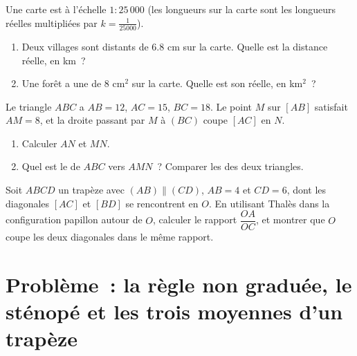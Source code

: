 \begin{exercise}[$\star\star$]\label{exo:g9:thales:7}
Une carte est à l'échelle $1 : 25\,000$ (les longueurs sur la carte sont
les longueurs réelles multipliées par $k = \frac{1}{25000}$).
\begin{enumerate}
  \item Deux villages sont distants de $6.8$ cm sur la carte. Quelle est
        la distance réelle, en km~?
  \item Une forêt a une  de $8$ cm$^2$ sur la carte. Quelle est son
         réelle, en km$^2$~?
\end{enumerate}
\end{exercise}

\begin{exercise}[$\star\star$]\label{exo:g9:thales:8}
Le triangle $ABC$ a $AB = 12$, $AC = 15$, $BC = 18$. Le point $M$ sur
$[AB]$ satisfait $AM = 8$, et la droite passant par $M$  à
$(BC)$ coupe $[AC]$ en $N$.
\begin{enumerate}
  \item Calculer $AN$ et $MN$.
  \item Quel est le  de $ABC$ vers $AMN$~? Comparer les
         des deux triangles.
\end{enumerate}
\end{exercise}

\begin{exercise}[$\star\star\star$]\label{exo:g9:thales:9}
Soit $ABCD$ un trapèze avec $(AB) \parallel (CD)$, $AB = 4$ et $CD = 6$,
dont les diagonales $[AC]$ et $[BD]$ se rencontrent en $O$. En utilisant
Thalès dans la configuration papillon autour de $O$, calculer le rapport
$\dfrac{OA}{OC}$, et montrer que $O$ coupe les deux diagonales dans le
même rapport.
\end{exercise}

\section{Problème~: la règle non graduée, le sténopé et les trois
moyennes d'un trapèze}


